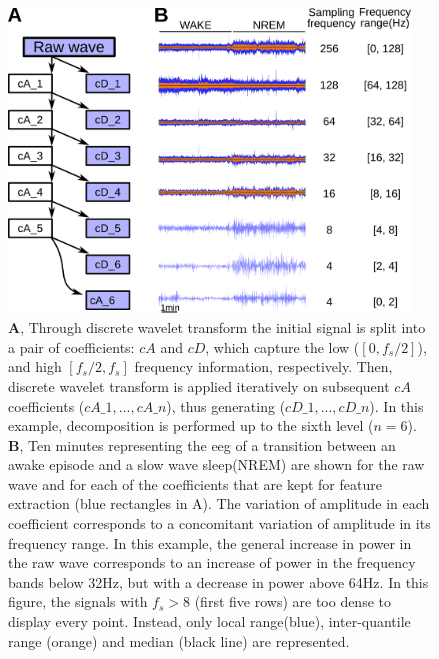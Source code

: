 \begin{figure}[h!]
  \centering   
    \includegraphics[width=0.95\textwidth]{figures/dwd.pdf}
  \caption{
	\textbf{A}, Through discrete wavelet transform the initial signal is split into a pair of coefficients: $cA$ and $cD$, which capture the low ($[0, f_s/2]$), and high $[f_s/2, f_s]$ frequency information, respectively.
	Then, discrete wavelet transform is applied iteratively on subsequent $cA$ coefficients ($cA\_1, ..., cA\_n$), thus generating ($cD\_1, ..., cD\_n$).
	In this example, decomposition is performed up to the sixth level ($n=6$).
	\textbf{B}, 
	Ten minutes representing the \gls{eeg} of a transition between an awake episode and a slow wave sleep(NREM) are shown for the raw
	 wave and for each of the coefficients that are kept for feature extraction (blue rectangles in A).
	 The variation of amplitude in each coefficient corresponds to a concomitant variation of amplitude in its frequency range.
	 In this example, the general increase in power in the raw wave corresponds to an increase of power in the frequency bands below 32Hz, but with a decrease in power above 64Hz.
	In this figure, the signals with $f_s > 8$ (first five rows) are too dense to display every point. 
	Instead, only local range(blue), inter-quantile range (orange) and median (black line) are represented.
  \label{fig:dwd}
  }
\end{figure}





